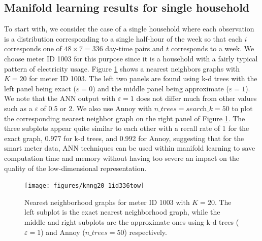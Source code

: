 \documentclass[11pt,a4paper,]{article}
\begin{document}
\hypertarget{electricityresults}{%
\subsection{Manifold learning results for single household}\label{electricityresults}}

To start with, we consider the case of a single household where each observation is a distribution corresponding to a single half-hour of the week so that each \(i\) corresponds one of \(48 \times 7 = 336\) day-time pairs and \(t\) corresponds to a week. We choose meter ID 1003 for this purpose since it is a household with a fairly typical pattern of electricity usage. Figure \ref{fig:neighborplot} shows a nearest neighbors graphs with \(K=20\) for meter ID 1003. The left two panels are found using k-d trees with the left panel being exact (\(\varepsilon = 0\)) and the middle panel being approximate (\(\varepsilon = 1\)).
We note that the ANN output with \(\varepsilon = 1\) does not differ much from other values such as a \(\varepsilon\) of 0.5 or 2. We also use Annoy with \(\textit{n\_trees}=\textit{search\_k}=50\) to plot the corresponding nearest neighbor graph on the right panel of Figure \ref{fig:neighborplot}.
The three subplots appear quite similar to each other with a recall rate of 1 for the exact graph, 0.977 for k-d trees, and 0.992 for Annoy, suggesting that for the smart meter data, ANN techniques can be used within manifold learning to save computation time and memory without having too severe an impact on the quality of the low-dimensional representation.

\begin{figure}

{\centering \texttt{[image: figures/knng20\_1id336tow]} 

}

\caption{Nearest neighborhood graphs for meter ID 1003 with $K=20$. The left subplot is the exact nearest neighborhood graph, while the middle and right subplots are the approximate ones using k-d trees ($\varepsilon = 1$) and Annoy ($\textit{n\_trees}=50$) respectively.}\label{fig:neighborplot}
\end{figure}
\end{document}

